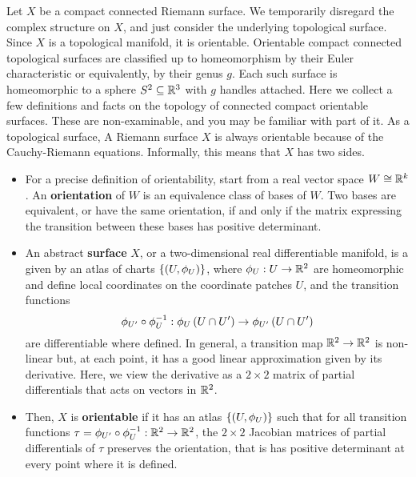 Let $ X $ be a compact connected Riemann surface. We temporarily disregard the complex structure on $ X $, and just consider the underlying topological surface. Since $ X $ is a topological manifold, it is orientable. Orientable compact connected topological surfaces are classified up to homeomorphism by their Euler characteristic or equivalently, by their genus $ g $. Each such surface is homeomorphic to a sphere $ S^2 \subseteq \mathbb{R}^3 $ with $ g $ handles attached. Here we collect a few definitions and facts on the topology of connected compact orientable surfaces. These are non-examinable, and you may be familiar with part of it. As a topological surface, A Riemann surface $ X $ is always orientable because of the Cauchy-Riemann equations. Informally, this means that $ X $ has two sides.
\begin{itemize}
\item For a precise definition of orientability, start from a real vector space $ W \cong \mathbb{R}^k $. An \textbf{orientation} of $ W $ is an equivalence class of bases of $ W $. Two bases are equivalent, or have the same orientation, if and only if the matrix expressing the transition between these bases has positive determinant.
\item An abstract \textbf{surface} $ X $, or a two-dimensional real differentiable manifold, is a given by an atlas of charts $ \left\{ \left( U, \phi_U \right) \right\} $, where $ \phi_U : U \to \mathbb{R}^2 $ are homeomorphic and define local coordinates on the coordinate patches $ U $, and the transition functions
$$ \phi_{U'} \circ \phi_U^{-1} : \phi_U\left( U \cap U' \right) \to \phi_{U'}\left( U \cap U' \right) $$
are differentiable where defined. In general, a transition map $ \mathbb{R}^2 \to \mathbb{R}^2 $ is non-linear but, at each point, it has a good linear approximation given by its derivative. Here, we view the derivative as a $ 2 \times 2 $ matrix of partial differentials that acts on vectors in $ \mathbb{R}^2 $.
\item Then, $ X $ is \textbf{orientable} if it has an atlas $ \left\{ \left( U, \phi_U \right) \right\} $ such that for all transition functions $ \tau = \phi_{U'} \circ \phi_U^{-1} : \mathbb{R}^2 \to \mathbb{R}^2 $, the $ 2 \times 2 $ Jacobian matrices of partial differentials of $ \tau $ preserves the orientation, that is has positive determinant at every point where it is defined.
\end{itemize}
